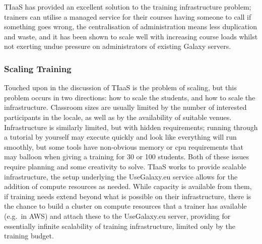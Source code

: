 \documentclass[10pt,letterpaper]{article}
\begin{document}
TIaaS has provided an excellent solution to the training infrastructure problem; trainers can utilise a managed service for their courses having someone to call if something goes wrong, the centralisation of administration means less duplication and waste, and it has been shown to scale well with increasing course loads whilst not exerting undue pressure on administrators of existing Galaxy servers.

\subsubsection*{Scaling Training}
Touched upon in the discussion of TIaaS is the problem of scaling, but this problem occurs in two directions: how to scale the students, and how to scale the infrastructure.
Classroom sizes are usually limited by the number of interested participants in the locale, as well as by the availability of suitable venues.
Infrastructure is similarly limited, but with hidden requirements; running through a tutorial by yourself may execute quickly and look like everything will run smoothly, but some tools have non-obvious memory or cpu requirements that may balloon when giving a training for 30 or 100 students.
Both of these issues require planning and some creativity to solve.
TIaaS works to provide scalable infrastructure, the setup underlying the UseGalaxy.eu service allows for the addition of compute resources as needed.
While capacity is available from them, if training needs extend beyond what is possible on their infrastructure, there is the chance to build a cluster on compute resources that a trainer has available (e.g.\ in AWS) and attach these to the UseGalaxy.eu server, providing for essentially infinite scalability of training infrastructure, limited only by the training budget.
\end{document}
